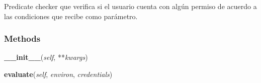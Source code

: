 Predicate checker que verifica si el usuario cuenta con algún permiso de 
acuerdo a las condiciones que recibe como parámetro.



  \subsubsection{Methods}

    \label{saip:lib:auth:TieneAlgunPermiso:__init__}

    \vspace{0.5ex}

\hspace{.8\funcindent}\begin{boxedminipage}{\funcwidth}

    \raggedright \textbf{\_\_init\_\_}(\textit{self}, **\textit{kwargs})

\setlength{\parskip}{2ex}
\setlength{\parskip}{1ex}
    \end{boxedminipage}

    \label{saip:lib:auth:TieneAlgunPermiso:evaluate}

    \vspace{0.5ex}

\hspace{.8\funcindent}\begin{boxedminipage}{\funcwidth}

    \raggedright \textbf{evaluate}(\textit{self}, \textit{environ}, \textit{credentials})

\setlength{\parskip}{2ex}
\setlength{\parskip}{1ex}
    \end{boxedminipage}



